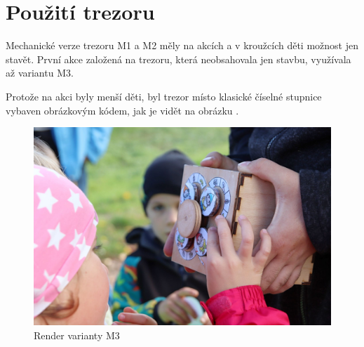 \section{Použití trezoru}
Mechanické verze trezoru M1 a M2 měly na akcích a v kroužcích děti možnost jen stavět. První akce založená na trezoru, která neobsahovala jen stavbu, využívala až variantu M3.

Protože na akci byly menší děti, byl trezor místo klasické číselné stupnice  vybaven obrázkovým kódem, jak je vidět na obrázku .

\begin{figure}[htbp]
    \centering
    \includegraphics[width=\textwidth]{kapitoly/obrazky/M3/trpaslici.png}
    \caption{Render varianty M3}
    \label{fig:M3-trpaslici}
\end{figure}